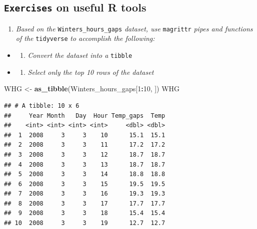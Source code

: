 \documentclass[
]{article}
\newenvironment{Shaded}{\begin{snugshade}}{\end{snugshade}}
\newcommand{\DecValTok}[1]{\textcolor[rgb]{0.00,0.00,0.81}{#1}}
\newcommand{\FunctionTok}[1]{\textcolor[rgb]{0.13,0.29,0.53}{\textbf{#1}}}
\newcommand{\NormalTok}[1]{#1}
\newcommand{\OtherTok}[1]{\textcolor[rgb]{0.56,0.35,0.01}{#1}}
\newcommand{\SpecialCharTok}[1]{\textcolor[rgb]{0.81,0.36,0.00}{\textbf{#1}}}
\providecommand{\tightlist}{%
  \setlength{\itemsep}{0pt}\setlength{\parskip}{0pt}}
\begin{document}
\subsection{\texorpdfstring{\texttt{Exercises} on useful R tools}{Exercises on useful R tools}}\label{exercises-on-useful-r-tools}

\begin{enumerate}
\def\labelenumi{\arabic{enumi}.}
\tightlist
\item
  \emph{Based on the} \texttt{Winters\_hours\_gaps} \emph{dataset, use} \texttt{magrittr} \emph{pipes and functions of the} \texttt{tidyverse} \emph{to accomplish the following:}
\end{enumerate}

\begin{itemize}
\tightlist
\item
  \begin{enumerate}
  \def\labelenumi{\alph{enumi})}
  \tightlist
  \item
    \emph{Convert the dataset into a} \texttt{tibble}
  \end{enumerate}
\item
  \begin{enumerate}
  \def\labelenumi{\alph{enumi})}
  \setcounter{enumi}{1}
  \tightlist
  \item
    \emph{Select only the top 10 rows of the dataset}
  \end{enumerate}
\end{itemize}

\begin{Shaded}
\begin{Highlighting}[]
\NormalTok{WHG }\OtherTok{\textless{}{-}} \FunctionTok{as\_tibble}\NormalTok{(Winters\_hours\_gaps[}\DecValTok{1}\SpecialCharTok{:}\DecValTok{10}\NormalTok{, ])}
\NormalTok{WHG}
\end{Highlighting}
\end{Shaded}

\begin{verbatim}
## # A tibble: 10 x 6
##     Year Month   Day  Hour Temp_gaps  Temp
##    <int> <int> <int> <int>     <dbl> <dbl>
##  1  2008     3     3    10      15.1  15.1
##  2  2008     3     3    11      17.2  17.2
##  3  2008     3     3    12      18.7  18.7
##  4  2008     3     3    13      18.7  18.7
##  5  2008     3     3    14      18.8  18.8
##  6  2008     3     3    15      19.5  19.5
##  7  2008     3     3    16      19.3  19.3
##  8  2008     3     3    17      17.7  17.7
##  9  2008     3     3    18      15.4  15.4
## 10  2008     3     3    19      12.7  12.7
\end{verbatim}
\end{document}
